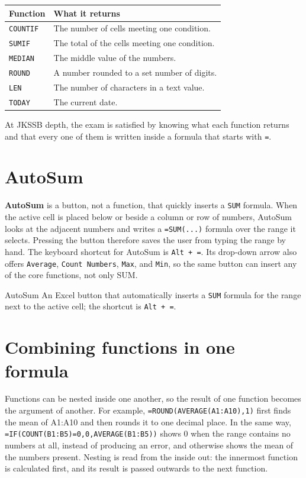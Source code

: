 \begin{center}
\begin{tabular}{p{}p{}}
\toprule
\textbf{Function} & \textbf{What it returns} \\
\midrule
\texttt{COUNTIF} & The number of cells meeting one condition. \\
\texttt{SUMIF} & The total of the cells meeting one condition. \\
\texttt{MEDIAN} & The middle value of the numbers. \\
\texttt{ROUND} & A number rounded to a set number of digits. \\
\texttt{LEN} & The number of characters in a text value. \\
\texttt{TODAY} & The current date. \\
\bottomrule
\end{tabular}
\end{center}

At JKSSB depth, the exam is satisfied by knowing what each function returns
and that every one of them is written inside a formula that starts with
\texttt{=}.

\section{AutoSum}
\textbf{AutoSum} is a button, not a function, that quickly inserts a
\texttt{SUM} formula. When the active cell is placed below or beside a column
or row of numbers, AutoSum looks at the adjacent numbers and writes a
\texttt{=SUM(...)} formula over the range it selects. Pressing the button
therefore saves the user from typing the range by hand. The keyboard shortcut
for AutoSum is \texttt{Alt + =}. Its drop-down arrow also offers
\texttt{Average}, \texttt{Count Numbers}, \texttt{Max}, and \texttt{Min}, so
the same button can insert any of the core functions, not only SUM.

\begin{definitionbox}{AutoSum}
An Excel button that automatically inserts a \texttt{SUM} formula for the
range next to the active cell; the shortcut is \texttt{Alt + =}.
\end{definitionbox}

\section{Combining functions in one formula}
Functions can be nested inside one another, so the result of one function
becomes the argument of another. For example,
\texttt{=ROUND(AVERAGE(A1:A10),1)} first finds the mean of A1:A10 and then
rounds it to one decimal place. In the same way,
\texttt{=IF(COUNT(B1:B5)=0,0,AVERAGE(B1:B5))} shows 0 when the range contains
no numbers at all, instead of producing an error, and otherwise shows the mean
of the numbers present. Nesting is read from the inside out: the innermost
function is calculated first, and its result is passed outwards to the next
function.

